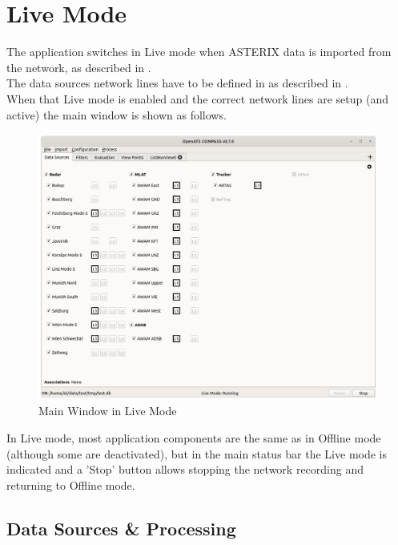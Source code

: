 \chapter{Live Mode}
\label{sec:live_mode}

The application switches in Live mode when ASTERIX data is imported from the network, as described in . \\

The data sources network lines have to be defined in as described in . \\

When that Live mode is enabled and the correct network lines are setup (and active) the main window is shown as follows. 

\begin{figure}[H]
  \hspace*{-2.5cm}
    \includegraphics[width=19cm]{figures/live_mode.png}
  \caption{Main Window in Live Mode}
\end{figure}

In Live mode, most application components are the same as in Offline mode (although some are deactivated), but in the main status bar the Live mode is indicated and a 'Stop' button allows stopping the network recording and returning to Offline mode.

\section{Data Sources \& Processing}

